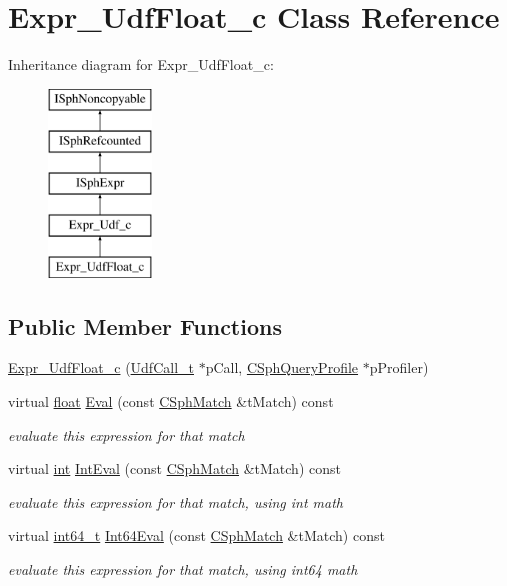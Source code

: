 \hypertarget{classExpr__UdfFloat__c}{\section{Expr\-\_\-\-Udf\-Float\-\_\-c Class Reference}
\label{classExpr__UdfFloat__c}
}
Inheritance diagram for Expr\-\_\-\-Udf\-Float\-\_\-c\-:\begin{figure}[H]
\begin{center}
\leavevmode
\includegraphics[height=5.000000cm]{classExpr__UdfFloat__c}
\end{center}
\end{figure}
\subsection*{Public Member Functions}
\begin{DoxyCompactItemize}
\item 
\hyperlink{classExpr__UdfFloat__c_a44a3ee814c9d4a57e25a4b12360d68c0}{Expr\-\_\-\-Udf\-Float\-\_\-c} (\hyperlink{structUdfCall__t}{Udf\-Call\-\_\-t} $\ast$p\-Call, \hyperlink{classCSphQueryProfile}{C\-Sph\-Query\-Profile} $\ast$p\-Profiler)
\item 
virtual \hyperlink{sphinxexpr_8cpp_a0e0d0739f7035f18f949c2db2c6759ec}{float} \hyperlink{classExpr__UdfFloat__c_a2c06eb61bb1cf538c492afedf68a33b0}{Eval} (const \hyperlink{classCSphMatch}{C\-Sph\-Match} \&t\-Match) const 
\begin{DoxyCompactList}\small\item\em evaluate this expression for that match \end{DoxyCompactList}\item 
virtual \hyperlink{sphinxexpr_8cpp_a4a26e8f9cb8b736e0c4cbf4d16de985e}{int} \hyperlink{classExpr__UdfFloat__c_ada5145509e17ff3f34e031541a6c137f}{Int\-Eval} (const \hyperlink{classCSphMatch}{C\-Sph\-Match} \&t\-Match) const 
\begin{DoxyCompactList}\small\item\em evaluate this expression for that match, using int math \end{DoxyCompactList}\item 
virtual \hyperlink{sphinxstd_8h_a996e72f71b11a5bb8b3b7b6936b1516d}{int64\-\_\-t} \hyperlink{classExpr__UdfFloat__c_a6e18a9fcba1f091d3f95102ec4a9fee1}{Int64\-Eval} (const \hyperlink{classCSphMatch}{C\-Sph\-Match} \&t\-Match) const 
\begin{DoxyCompactList}\small\item\em evaluate this expression for that match, using int64 math \end{DoxyCompactList}\end{DoxyCompactItemize}
